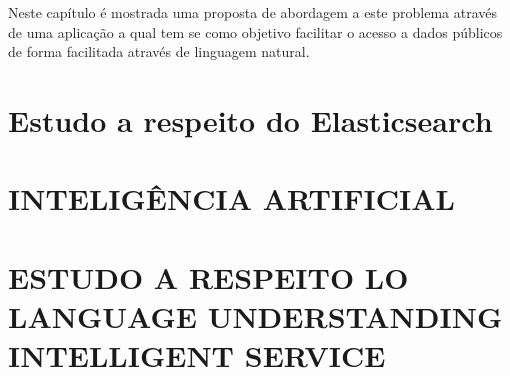 Neste capítulo é mostrada uma proposta de abordagem a este problema através de uma aplicação a qual tem se como objetivo facilitar o acesso a dados públicos de forma facilitada através de linguagem natural.

\section{Estudo a respeito do Elasticsearch}


\section{\uppercase{Inteligência Artificial}}


\section{\uppercase{Estudo a respeito lo Language Understanding Intelligent Service}}



